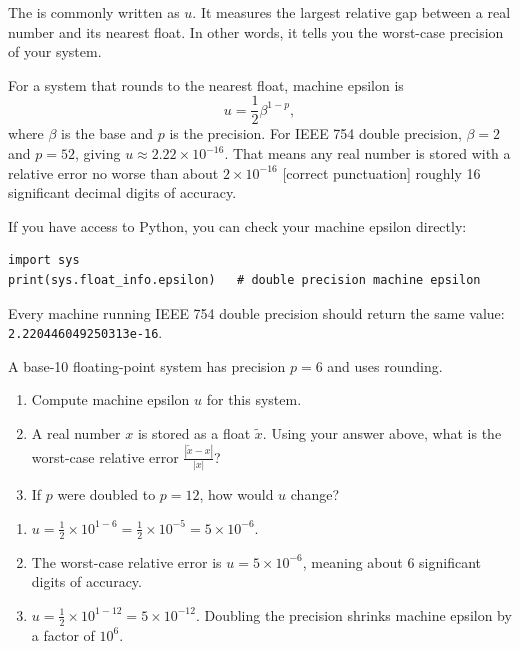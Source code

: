 The  is commonly written as $u$. It measures the largest relative gap between a real number and
its nearest float. In other words, it tells you the worst-case precision of your
system.

For a system that rounds to the nearest float, machine epsilon is
\[
    u = \frac{1}{2} \beta^{1-p},
\]
where $\beta$ is the base and $p$ is the precision. For IEEE 754 double precision,
$\beta = 2$ and $p = 52$, giving $u \approx 2.22 \times 10^{-16}$. That means any
real number is stored with a relative error no worse than about $2 \times 10^{-16}$ [correct punctuation]
roughly 16 significant decimal digits of accuracy.

If you have access to Python, you can check your machine epsilon directly:

\begin{verbatim}
import sys
print(sys.float_info.epsilon)   # double precision machine epsilon
\end{verbatim}

Every machine running IEEE 754 double precision should return the same value:
\texttt{2.220446049250313e-16}.

\begin{Exercise}[title={Machine Epsilon}, label={ex:machine}]
A base-10 floating-point system has precision $p = 6$ and uses rounding.
\begin{enumerate}
    \item Compute machine epsilon $u$ for this system.
    \item A real number $x$ is stored as a float $\tilde{x}$. Using your answer above,
    what is the worst-case relative error $\frac{|\tilde{x} - x|}{|x|}$?
    \item If $p$ were doubled to $p = 12$, how would $u$ change?
\end{enumerate}
\end{Exercise}
\begin{Answer}[ref={ex:machine}]
\begin{enumerate}
    \item $u = \frac{1}{2} \times 10^{1-6} = \frac{1}{2} \times 10^{-5} = 5 \times
    10^{-6}$.
    \item The worst-case relative error is $u = 5 \times 10^{-6}$, meaning about 6
    significant digits of accuracy.
    \item $u = \frac{1}{2} \times 10^{1-12} = 5 \times 10^{-12}$. Doubling the
    precision shrinks machine epsilon by a factor of $10^6$.
\end{enumerate}
\end{Answer}

